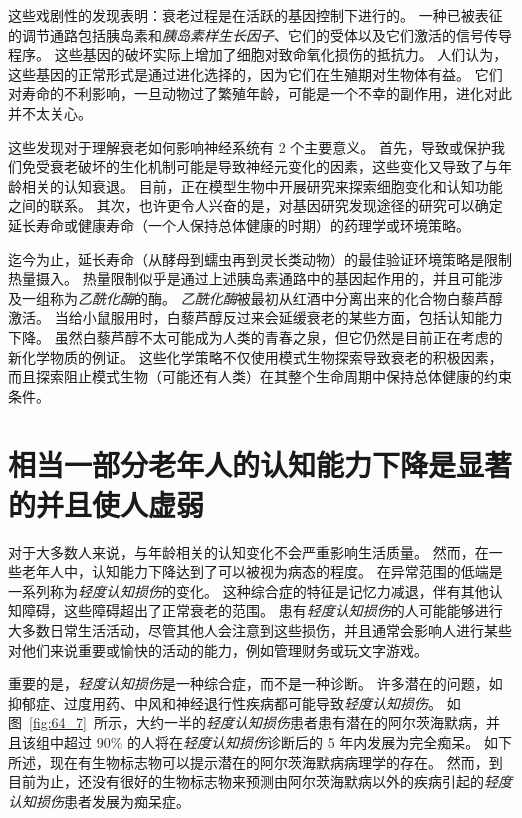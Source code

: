 这些戏剧性的发现表明：衰老过程是在活跃的基因控制下进行的。
一种已被表征的调节通路包括胰岛素和\textit{胰岛素样生长因子}、它们的受体以及它们激活的信号传导程序。
这些基因的破坏实际上增加了细胞对致命氧化损伤的抵抗力。
人们认为，这些基因的正常形式是通过进化选择的，因为它们在生殖期对生物体有益。
它们对寿命的不利影响，一旦动物过了繁殖年龄，可能是一个不幸的副作用，进化对此并不太关心。


这些发现对于理解衰老如何影响神经系统有 2 个主要意义。
首先，导致或保护我们免受衰老破坏的生化机制可能是导致神经元变化的因素，这些变化又导致了与年龄相关的认知衰退。
目前，正在模型生物中开展研究来探索细胞变化和认知功能之间的联系。
其次，也许更令人兴奋的是，对基因研究发现途径的研究可以确定延长寿命或健康寿命（一个人保持总体健康的时期）的药理学或环境策略。


迄今为止，延长寿命（从酵母到蠕虫再到灵长类动物）的最佳验证环境策略是限制热量摄入。
热量限制似乎是通过上述胰岛素通路中的基因起作用的，并且可能涉及一组称为\textit{乙酰化酶}的酶。
\textit{乙酰化酶}被最初从红酒中分离出来的化合物白藜芦醇激活。
当给小鼠服用时，白藜芦醇反过来会延缓衰老的某些方面，包括认知能力下降。
虽然白藜芦醇不太可能成为人类的青春之泉，但它仍然是目前正在考虑的新化学物质的例证。
这些化学策略不仅使用模式生物探索导致衰老的积极因素，而且探索阻止模式生物（可能还有人类）在其整个生命周期中保持总体健康的约束条件。



\section{相当一部分老年人的认知能力下降是显著的并且使人虚弱}

对于大多数人来说，与年龄相关的认知变化不会严重影响生活质量。
然而，在一些老年人中，认知能力下降达到了可以被视为病态的程度。
在异常范围的低端是一系列称为\textit{轻度认知损伤}的变化。
这种综合症的特征是记忆力减退，伴有其他认知障碍，这些障碍超出了正常衰老的范围。
患有\textit{轻度认知损伤}的人可能能够进行大多数日常生活活动，尽管其他人会注意到这些损伤，并且通常会影响人进行某些对他们来说重要或愉快的活动的能力，例如管理财务或玩文字游戏。


重要的是，\textit{轻度认知损伤}是一种综合症，而不是一种诊断。
许多潜在的问题，如抑郁症、过度用药、中风和神经退行性疾病都可能导致\textit{轻度认知损伤}。
如图~\ref{fig:64_7}~所示，大约一半的\textit{轻度认知损伤}患者患有潜在的阿尔茨海默病，并且该组中超过 90\% 的人将在\textit{轻度认知损伤}诊断后的 5 年内发展为完全痴呆。
如下所述，现在有生物标志物可以提示潜在的阿尔茨海默病病理学的存在。
然而，到目前为止，还没有很好的生物标志物来预测由阿尔茨海默病以外的疾病引起的\textit{轻度认知损伤}患者发展为痴呆症。


